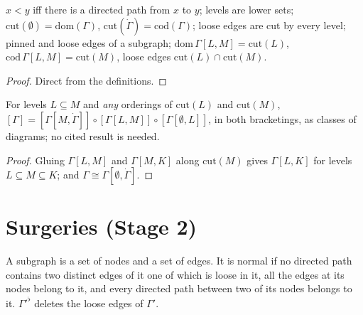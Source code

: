 \begin{lemma}
\label{lem:2.layers}
\leanok
{}
$x < y$ iff there is a directed path from $x$ to $y$; levels are lower sets;
$\mathrm{cut}(\emptyset) = \mathrm{dom}(\Gamma)$, $\mathrm{cut}(\dot\Gamma) =
\mathrm{cod}(\Gamma)$; loose edges are cut by every level; pinned and loose edges
of a subgraph; $\mathrm{dom}\,\Gamma[L,M] = \mathrm{cut}(L)$,
$\mathrm{cod}\,\Gamma[L,M] = \mathrm{cut}(M)$, loose edges
$\mathrm{cut}(L) \cap \mathrm{cut}(M)$.
\end{lemma}
\begin{proof}
\leanok
Direct from the definitions.
\end{proof}

\begin{remark}[Remark 2.4]
\label{rem:2.4}
\leanok
{}
For levels $L \subseteq M$ and \emph{any} orderings of $\mathrm{cut}(L)$ and
$\mathrm{cut}(M)$,
$[\Gamma] = [\Gamma[M, \dot\Gamma]] \circ [\Gamma[L, M]] \circ [\Gamma[\emptyset, L]]$,
in both bracketings, as classes of diagrams; no cited result is needed.
\end{remark}
\begin{proof}
\leanok
Gluing $\Gamma[L, M]$ and $\Gamma[M, K]$ along $\mathrm{cut}(M)$ gives
$\Gamma[L, K]$ for levels $L \subseteq M \subseteq K$; and
$\Gamma \cong \Gamma[\emptyset, \dot\Gamma]$.
\end{proof}

\section{Surgeries (Stage 2)}

\begin{definition}
\label{def:3.1}
\leanok
{}
A subgraph is a set of nodes and a set of edges.  It is normal if no directed path
contains two distinct edges of it one of which is loose in it, all the edges at its
nodes belong to it, and every directed path between two of its nodes belongs to it.
$\Gamma'^\flat$ deletes the loose edges of $\Gamma'$.
\end{definition}

